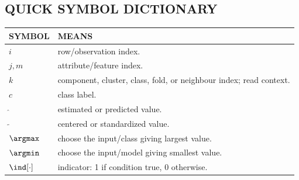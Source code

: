 \subsection*{QUICK SYMBOL DICTIONARY}
\begin{tabularx}{\linewidth}{@{}lX@{}}
\toprule
SYMBOL & MEANS\\ \midrule
$i$ & row/observation index.\\
$j,m$ & attribute/feature index.\\
$k$ & component, cluster, class, fold, or neighbour index; read context.\\
$c$ & class label.\\
$\hat{\ }$ & estimated or predicted value.\\
$\tilde{\ }$ & centered or standardized value.\\
$\argmax$ & choose the input/class giving largest value.\\
$\argmin$ & choose the input/model giving smallest value.\\
$\ind[\cdot]$ & indicator: 1 if condition true, 0 otherwise.\\
\bottomrule
\end{tabularx}
